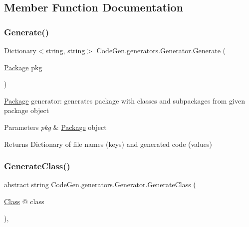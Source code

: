\subsection{Member Function Documentation}
\mbox{\label{classCodeGen_1_1generators_1_1Generator_a5c5f7f56cdb910dc5d71ed407f874d84}} 
\subsubsection{\texorpdfstring{Generate()}{Generate()}}
{\footnotesize\ttfamily Dictionary$<$string, string$>$ Code\+Gen.\+generators.\+Generator.\+Generate (\begin{DoxyParamCaption}\item[{\mbox{\hyperlink{classCodeGen_1_1generators_1_1Package}{Package}}}]{pkg }\end{DoxyParamCaption})\hspace{0.3cm}{\ttfamily [inline]}}



\mbox{\hyperlink{classCodeGen_1_1generators_1_1Package}{Package}} generator\+: generates package with classes and subpackages from given package object 


\begin{DoxyParams}{Parameters}
{\em pkg} & \mbox{\hyperlink{classCodeGen_1_1generators_1_1Package}{Package}} object\\
\hline
\end{DoxyParams}
\begin{DoxyReturn}{Returns}
Dictionary of file names (keys) and generated code (values)
\end{DoxyReturn}
\mbox{\label{classCodeGen_1_1generators_1_1Generator_a8847fd8b6d408a0dfc087dcc1dc58340}} 
\subsubsection{\texorpdfstring{Generate\+Class()}{GenerateClass()}}
{\footnotesize\ttfamily abstract string Code\+Gen.\+generators.\+Generator.\+Generate\+Class (\begin{DoxyParamCaption}\item[{\mbox{\hyperlink{classCodeGen_1_1generators_1_1Class}{Class}} @}]{class }\end{DoxyParamCaption})\hspace{0.3cm}{\ttfamily [protected]}, {}}



